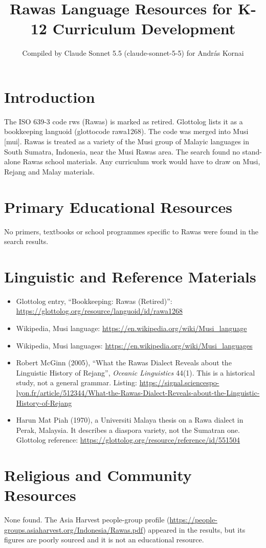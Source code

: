 \documentclass[12pt]{article}
\title{Rawas Language Resources for K-12 Curriculum Development}
\author{Compiled by Claude Sonnet 5.5 (claude-sonnet-5-5) for Andr\'as Kornai}
\date{}
\begin{document}
\maketitle

\section{Introduction}
The ISO 639-3 code rws (Rawas) is marked as retired. Glottolog lists it as a bookkeeping languoid (glottocode rawa1268). The code was merged into Musi [mui]. Rawas is treated as a variety of the Musi group of Malayic languages in South Sumatra, Indonesia, near the Musi Rawas area. The search found no stand-alone Rawas school materials. Any curriculum work would have to draw on Musi, Rejang and Malay materials.

\section{Primary Educational Resources}
No primers, textbooks or school programmes specific to Rawas were found in the search results.

\section{Linguistic and Reference Materials}
\begin{itemize}
\item Glottolog entry, ``Bookkeeping: Rawas (Retired)'': \url{https://glottolog.org/resource/languoid/id/rawa1268}
\item Wikipedia, Musi language: \url{https://en.wikipedia.org/wiki/Musi_language}
\item Wikipedia, Musi languages: \url{https://en.wikipedia.org/wiki/Musi_languages}
\item Robert McGinn (2005), ``What the Rawas Dialect Reveals about the Linguistic History of Rejang'', \emph{Oceanic Linguistics} 44(1). This is a historical study, not a general grammar. Listing: \url{https://signal.sciencespo-lyon.fr/article/512344/What-the-Rawas-Dialect-Reveals-about-the-Linguistic-History-of-Rejang}
\item Harun Mat Piah (1970), a Universiti Malaya thesis on a Rawa dialect in Perak, Malaysia. It describes a diaspora variety, not the Sumatran one. Glottolog reference: \url{https://glottolog.org/resource/reference/id/551504}
\end{itemize}

\section{Religious and Community Resources}
None found. The Asia Harvest people-group profile (\url{https://people-groups.asiaharvest.org/Indonesia/Rawas.pdf}) appeared in the results, but its figures are poorly sourced and it is not an educational resource.
\end{document}
